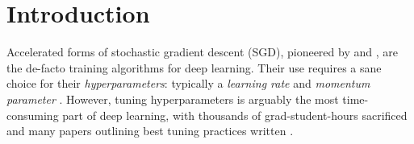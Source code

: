 \section{Introduction}


\outline{[Problem.]}
Accelerated forms of stochastic gradient descent (SGD), pioneered by
\citet{polyak1964some} and \citet{nesterov1983method}, are the de-facto
training algorithms for deep learning.
Their use requires a sane choice for their {\em hyperparameters}: 
typically a {\em learning rate} and {\em momentum parameter} \citep{sutskever2013importance}.
\outline{[Hardness.]}
However, tuning hyperparameters is arguably the most time-consuming part of deep learning, with thousands of grad-student-hours sacrificed and many papers outlining best tuning practices written
\cite{bengio2012practical,orr2003neural,bengio2012deep,bottou2012stochastic}.

